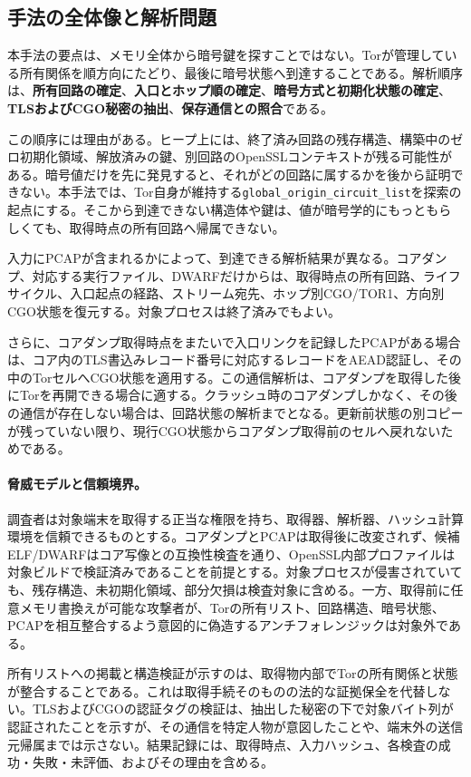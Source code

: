\documentclass[10pt,a4paper]{ltjsarticle}
\newcommand{\code}[1]{\nolinkurl{#1}}
\newcommand{\torone}{\textsc{TOR1}}
\begin{document}
\subsection{手法の全体像と解析問題}

本手法の要点は、メモリ全体から暗号鍵を探すことではない。Torが管理している所有関係を順方向にたどり、最後に暗号状態へ到達することである。解析順序は、\textbf{所有回路の確定}、\textbf{入口とホップ順の確定}、\textbf{暗号方式と初期化状態の確定}、\textbf{TLSおよびCGO秘密の抽出}、\textbf{保存通信との照合}である。

この順序には理由がある。ヒープ上には、終了済み回路の残存構造、構築中のゼロ初期化領域、解放済みの鍵、別回路のOpenSSLコンテキストが残る可能性がある。暗号値だけを先に発見すると、それがどの回路に属するかを後から証明できない。本手法では、Tor自身が維持する\code{global_origin_circuit_list}を探索の起点にする。そこから到達できない構造体や鍵は、値が暗号学的にもっともらしくても、取得時点の所有回路へ帰属できない。

入力にPCAPが含まれるかによって、到達できる解析結果が異なる。コアダンプ、対応する実行ファイル、DWARFだけからは、取得時点の所有回路、ライフサイクル、入口起点の経路、ストリーム宛先、ホップ別CGO/\torone{}、方向別CGO状態を復元する。対象プロセスは終了済みでもよい。

さらに、コアダンプ取得時点をまたいで入口リンクを記録したPCAPがある場合は、コア内のTLS書込みレコード番号に対応するレコードをAEAD認証し、その中のTorセルへCGO状態を適用する。この通信解析は、コアダンプを取得した後にTorを再開できる場合に適する。クラッシュ時のコアダンプしかなく、その後の通信が存在しない場合は、回路状態の解析までとなる。更新前状態の別コピーが残っていない限り、現行CGO状態からコアダンプ取得前のセルへ戻れないためである。


\paragraph{脅威モデルと信頼境界。}
調査者は対象端末を取得する正当な権限を持ち、取得器、解析器、ハッシュ計算環境を信頼できるものとする。コアダンプとPCAPは取得後に改変されず、候補ELF/DWARFはコア写像との互換性検査を通り、OpenSSL内部プロファイルは対象ビルドで検証済みであることを前提とする。対象プロセスが侵害されていても、残存構造、未初期化領域、部分欠損は検査対象に含める。一方、取得前に任意メモリ書換えが可能な攻撃者が、Torの所有リスト、回路構造、暗号状態、PCAPを相互整合するよう意図的に偽造するアンチフォレンジックは対象外である。

所有リストへの掲載と構造検証が示すのは、取得物内部でTorの所有関係と状態が整合することである。これは取得手続そのものの法的な証拠保全を代替しない。TLSおよびCGOの認証タグの検証は、抽出した秘密の下で対象バイト列が認証されたことを示すが、その通信を特定人物が意図したことや、端末外の送信元帰属までは示さない。結果記録には、取得時点、入力ハッシュ、各検査の成功・失敗・未評価、およびその理由を含める。
\end{document}
